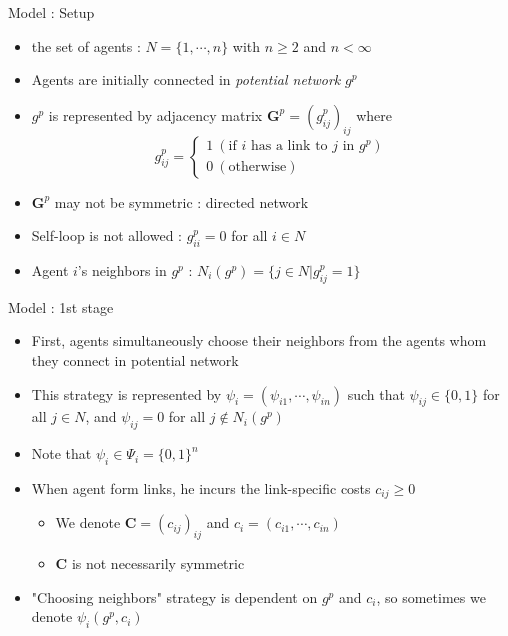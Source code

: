 \documentclass[10pt,dvipdfmx]{beamer}
\begin{document}
\begin{frame}{Model : Setup}
\begin{itemize}
    \item the set of agents : $N = \{ 1, \cdots, n \}$ with $n \ge 2$ and $n < \infty$
    \item Agents are initially connected in {\it{potential network}} $g^p$
    \item $g^p$ is represented by adjacency matrix $\bm{G}^p = {(g_{ij}^p)}_{ij}$ where
    \[ g_{ij}^p =
        \begin{cases}
            1 \  (\text{if $i$ has a link to $j$ in $g^p $}) \\
            0 \  (\text{otherwise})
        \end{cases} \]
    \item $\bm{G}^p$ may not be symmetric : directed network
    \item Self-loop is not allowed : $g_{ii}^p = 0$ for all $i \in N$
    \item Agent $i$'s neighbors in $g^p$ : $N_i(g^p) = \{ j \in N | g_{ij}^p = 1 \}$
\end{itemize}
\end{frame}

\begin{frame}{Model : 1st stage}
\begin{itemize}
    \item First, agents simultaneously choose their neighbors from the agents whom they connect in potential network
    \item This strategy is represented by $\psi_i = (\psi_{i1}, \cdots, \psi_{in})$ such that $\psi_{ij} \in \{0, 1\}$ for all $j \in N$, and $\psi_{ij} = 0$ for all $j \notin N_i(g^p)$
    \item Note that $\psi_i \in \Psi_i = \{0,1\}^n$
    \item When agent form links, he incurs the link-specific costs $c_{ij} \ge 0$
    \begin{itemize}
        \item We denote $\bm{C} = {(c_{ij})}_{ij}$ and $c_i = (c_{i1}, \cdots, c_{in})$
        \item $\bm{C}$ is not necessarily symmetric
    \end{itemize}
    \item "Choosing neighbors" strategy is dependent on $g^p$ and $c_i$, so sometimes we denote $\psi_i(g^p, c_i)$
\end{itemize}
\end{frame}
\end{document}
